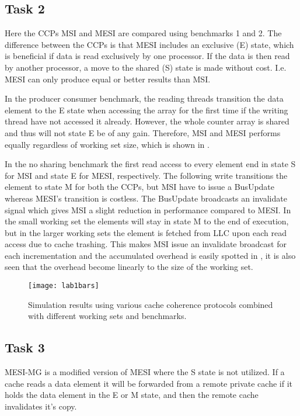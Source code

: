 \subsection{Task 2}
\label{sec:lab12}
Here the CCPs MSI and MESI are compared using benchmarks 1 and 2. The difference between the CCPs is that MESI includes an exclusive (E) state, which is beneficial if data is read exclusively by one processor. If the data is then read by another processor, a move to the shared (S) state is made without cost. I.e. MESI can only produce equal or better results than MSI.

In the producer consumer benchmark, the reading threads transition the data element to the E state when accessing the array for the first time if the writing thread have not accessed it already. However, the whole counter array is shared and thus will not state E be of any gain. Therefore, MSI and MESI performs equally regardless of working set size, which is shown in .

In the no sharing benchmark the first read access to every element end in state S for MSI and state E for MESI, respectively. The following write transitions the element to state M for both the CCPs, but MSI have to issue a BusUpdate whereas MESI's transition is costless. The BusUpdate broadcasts an invalidate signal which gives MSI a slight reduction in performance compared to MESI. In the small working set the elements will stay in state M to the end of execution, but in the larger working sets the element is fetched from LLC upon each read access due to cache trashing. This makes MSI issue an invalidate broadcast for each incrementation and the accumulated overhead is easily spotted in , it is also seen that the overhead become linearly to the size of the working set.

\begin{figure}[t]
	\center
	\texttt{[image: lab1bars]}
	\caption{Simulation results using various cache coherence protocols combined with different working sets and benchmarks.}
	\label{fig:resultslab1}
\end{figure}

\subsection{Task 3}
\label{sec:lab13}
MESI-MG is a modified version of MESI where the S state is not utilized. If a cache reads a data element it will be forwarded from a remote private cache if it holds the data element in the E or M state, and then the remote cache invalidates it's copy.